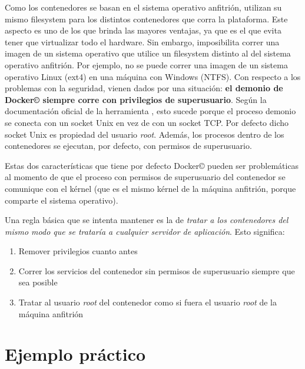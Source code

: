 \documentclass[14pt]{extarticle}
\newcommand{\docker}{Docker\copyright}
\begin{document}
        Como los contenedores se basan en el sistema operativo anfitrión, utilizan su mismo filesystem para los distintos contenedores que corra la plataforma. Este aspecto es uno de los que brinda las mayores ventajas, ya que es el que evita tener que virtualizar todo el hardware. Sin embargo, imposibilita correr una imagen de un sistema operativo que utilice un filesystem distinto al del sistema operativo anfitrión. Por ejemplo, no se puede correr una imagen de un sistema operativo Linux (ext4) en una máquina con Windows (NTFS).
        Con respecto a los problemas con la seguridad, vienen dados por una situación: \textbf{el demonio de \docker{} siempre corre con privilegios de superusuario}. Según la documentación oficial de la herramienta \cite{docs}, esto sucede porque el proceso demonio se conecta con un socket Unix en vez de con un socket TCP. Por defecto dicho socket Unix es propiedad del usuario \textit{root}. Además, los procesos dentro de los contenedores se ejecutan, por defecto, con permisos de superusuario.

        Estas dos características que tiene por defecto \docker{} pueden ser problemáticas al momento de que el proceso con permisos de superusuario del contenedor se comunique con el kérnel (que es el mismo kérnel de la máquina anfitrión, porque comparte el sistema operativo).  

        Una regla básica que se intenta mantener es la de \textit{tratar a los contenedores del mismo modo que se trataría a cualquier servidor de aplicación}. Esto significa:
        \begin{enumerate}
            \item Remover privilegios cuanto antes
            \item Correr los servicios del contenedor sin permisos de superusuario siempre que sea posible
            \item Tratar al usuario \textit{root} del contenedor como si fuera el usuario \textit{root} de la máquina anfitrión \cite{walsh}
        \end{enumerate}




    \clearpage
    \section{Ejemplo práctico}


    \clearpage
    
    
\end{document}
